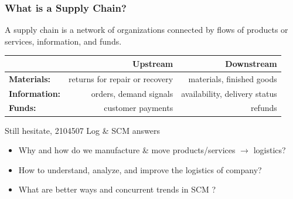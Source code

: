 \documentclass[10pt,handout]{beamer}
\begin{document}
\begin{frame}
  \frametitle{What is a Supply Chain?}

  \begin{alertblock}{}{}
  A supply chain is a network of organizations connected by flows of \alert{products or services}, \alert{information}, and \alert{funds}.
  \end{alertblock}

  \NextLine
  \begin{center}\small{
    \begin{tabular}{l|rr} \hline
                              & Upstream  & Downstream \\ \hline
    \textbf{Materials:}   & returns for repair or recovery & materials, finished goods   \\
    \textbf{Information:} & orders, demand signals          & availability, delivery status  \\
    \textbf{Funds:}       & customer payments              & refunds\\ \hline
    \end{tabular} }
  \end{center}

  \NextLine
  \begin{block}{\small{Still hesitate, 2104507 Log \& SCM answers} }{}
    \begin{itemize}
      \item Why and how do we manufacture \& move products/services $\rightarrow$ logistics?
      \item How to understand, analyze, and improve the logistics of \alert{company}?
      \item What are \alert{better ways} and concurrent trends in SCM ?
    \end{itemize}

  \end{block}


\end{frame}
\end{document}
